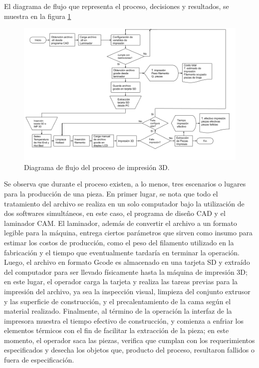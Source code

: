 El diagrama de flujo que representa el proceso, decisiones y resultados, se muestra en la figura \ref{proceso}

\begin{figure}[H]
\centering
\includegraphics[scale=0.4]{images/proceso.png}
\caption{Diagrama de flujo del proceso de impresión 3D.}
\label{proceso}
\end{figure}

Se observa que durante el proceso existen, a lo menos, tres escenarios o lugares para la producción de una pieza. En primer lugar, se nota que todo el tratamiento del archivo se realiza en un solo computador bajo la utilización de dos softwares simultáneos, en este caso, el programa de diseño CAD y el laminador CAM. El laminador, además de convertir el archivo a un formato legible para la máquina, entrega ciertos parámetros que sirven como insumo para estimar los costos de producción, como el peso del filamento utilizado en la fabricación y el tiempo que eventualmente tardaría en terminar la operación. Luego, el archivo en formato Gcode es almacenado en una tarjeta SD y extraído del computador para ser llevado físicamente hasta la máquina de impresión 3D; en este lugar, el operador carga la tarjeta y realiza las tareas previas para la impresión del archivo, ya sea la inspección visual, limpieza del conjunto extrusor y las superficie de construcción, y el precalentamiento de la cama según el material realizado. Finalmente, al término de la operación la interfaz de la impresora muestra el tiempo efectivo de construcción, y comienza a enfriar los elementos térmicos con el fin de facilitar la extracción de la pieza; en este momento, el operador saca las piezas, verifica que cumplan con los requerimientos especificados y desecha los objetos que, producto del proceso, resultaron fallidos o fuera de especificación. 

